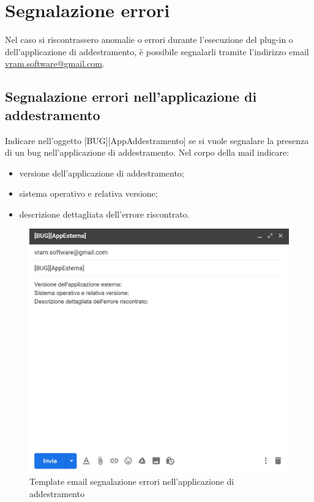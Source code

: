 \section{Segnalazione errori}
Nel caso si riscontrassero anomalie o errori durante l'esecuzione del plug-in o dell'applicazione di addestramento, è possibile segnalarli tramite l'indirizzo email {\url{vram.software@gmail.com}}.
	\subsection{Segnalazione errori nell'applicazione di addestramento}
	Indicare nell'oggetto [BUG][AppAddestramento] se si vuole segnalare la presenza di un bug nell'applicazione di addestramento.
	Nel corpo della mail indicare:
	\begin{itemize}
		\item versione dell'applicazione di addestramento;
		\item sistema operativo e relativa versione;
		\item descrizione dettagliata dell'errore riscontrato.
	\end{itemize}
	\mbox{}
	\begin{figure} [H]
		\begin{center}
			\includegraphics[width=120mm]{./img/erroriApp.jpg}
		\end{center}
		\caption{Template email segnalazione errori nell'applicazione di addestramento}
	\end{figure}
	\mbox{}
